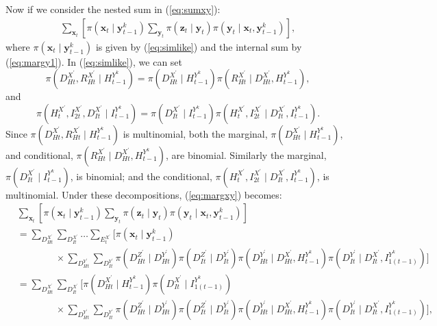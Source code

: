 \documentclass[a4paper]{article}
\newcommand{\bx}{\bm{x}}
\newcommand{\by}{\bm{y}}
\newcommand{\bz}{\bm{z}}
\begin{document}
Now if we consider the nested sum in (\ref{eq:sumxy}):
\begin{align}
    \sum_{\bx_t} \left[\pi\left(\bx_t \mid \by^k_{t - 1} \right)\sum_{\by_t} \pi\left(\bz_t \mid \by_t\right)\pi\left(\by_t \mid \bx_t, \by^k_{t - 1}\right)\right],\label{eq:margxy}
\end{align}
where $\pi\left(\bx_t \mid \by^k_{t - 1} \right)$ is given by (\ref{eq:simlike}) and the internal sum by (\ref{eq:margy1}). In (\ref{eq:simlike}), we can set
\begin{equation}
    \pi\left(D^{X^\prime}_{Ht}, R^{X^\prime}_{Ht} \mid H^{Y^k}_{t - 1}\right) = \pi\left(D^{X^\prime}_{Ht} \mid H^{Y^k}_{t - 1}\right)\pi\left(R^{X^\prime}_{Ht} \mid D^{X^\prime}_{Ht}, H^{Y^k}_{t - 1}\right),\label{eq:decomp1}
\end{equation}
and
\begin{equation}
    \pi\left(H^{X^\prime}_t, I^{X^\prime}_{2t}, D^{X^\prime}_{It} \mid I^{Y^k}_{t - 1}\right) = \pi\left(D^{X^\prime}_{It} \mid I^{Y^k}_{t - 1}\right)\pi\left(H^{X^\prime}_t, I^{X^\prime}_{2t} \mid D^{X^\prime}_{It}, I^{Y^k}_{t - 1}\right).\label{eq:decomp2}
\end{equation}
Since $\pi\left(D^{X^\prime}_{Ht}, R^{X^\prime}_{Ht} \mid H^{Y^k}_{t - 1}\right)$ is multinomial, both the marginal, $\pi\left(D^{X^\prime}_{Ht} \mid H^{Y^k}_{t - 1}\right)$, and conditional, $\pi\left(R^{X^\prime}_{Ht} \mid D^{X^\prime}_{Ht}, H^{Y^k}_{t - 1}\right)$, are binomial. Similarly the marginal, $\pi\left(D^{X^\prime}_{It} \mid I^{Y^k}_{t - 1}\right)$, is binomial; and the conditional, $\pi\left(H^{X^\prime}_t, I^{X^\prime}_{2t} \mid D^{X^\prime}_{It}, I^{Y^k}_{t - 1}\right)$, is multinomial. Under these decompositions, (\ref{eq:margxy}) becomes:
\begin{align}
   & \sum_{\bx_t} \left[\pi\left(\bx_t \mid \by^k_{t - 1} \right)\sum_{\by_t} \pi\left(\bz_t \mid \by_t\right)\pi\left(\by_t \mid \bx_t, \by^k_{t - 1}\right)\right] \nonumber\\
   &= \sum_{D^{X^\prime}_{Ht}}\sum_{D^{X^\prime}_{It}}\dots\sum_{E^{X^\prime}_t} \Bigg[\pi\left(\bx_t \mid \by^k_{t - 1} \right)\nonumber\\
   & \qquad \qquad \times \sum_{D^{Y^\prime}_{Ht}}\sum_{D^{Y^\prime}_{It}} \pi\left(D^{Z^\prime}_{Ht} \mid D^{Y^\prime}_{Ht}\right)\pi\left(D^{Z^\prime}_{It} \mid D^{Y^\prime}_{It}\right) \pi\left(D^{Y^\prime}_{Ht} \mid D^{X^\prime}_{Ht}, H^{Y^k}_{t - 1}\right)\pi\left(D^{Y^\prime}_{It} \mid D^{X^\prime}_{It}, I^{Y^k}_{1(t - 1)}\right)\Bigg]\nonumber\\
    &= \sum_{D^{X^\prime}_{Ht}}\sum_{D^{X^\prime}_{It}} \Bigg[\pi\left(D^{X^\prime}_{Ht} \mid H^{Y^k}_{t - 1}\right)\pi\left(D^{X^\prime}_{It} \mid I^{Y^k}_{1(t - 1)}\right) \nonumber\\
    & \qquad \qquad \times  \sum_{D^{Y^\prime}_{Ht}}\sum_{D^{Y^\prime}_{It}} \pi\left(D^{Z^\prime}_{Ht} \mid D^{Y^\prime}_{Ht}\right)\pi\left(D^{Z^\prime}_{It} \mid D^{Y^\prime}_{It}\right) \pi\left(D^{Y^\prime}_{Ht} \mid D^{X^\prime}_{Ht}, H^{Y^k}_{t - 1}\right)\pi\left(D^{Y^\prime}_{It} \mid D^{X^\prime}_{It}, I^{Y^k}_{1(t - 1)}\right)\Bigg],\label{eq:qmargxy}
\end{align}
\end{document}

